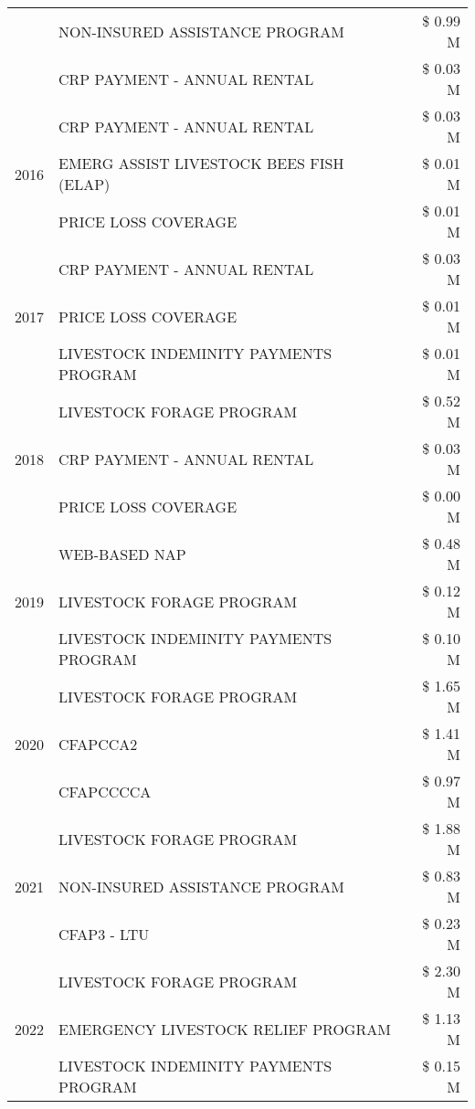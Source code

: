 \begin{tabular}{llr}
 & NON-INSURED ASSISTANCE PROGRAM & \$ 0.99 M \\
 & CRP PAYMENT - ANNUAL RENTAL & \$ 0.03 M \\
\cline{1-3}
\multirow[t]{3}{*}{2016} & CRP PAYMENT - ANNUAL RENTAL & \$ 0.03 M \\
 & EMERG ASSIST LIVESTOCK BEES FISH (ELAP) & \$ 0.01 M \\
 & PRICE LOSS COVERAGE & \$ 0.01 M \\
\cline{1-3}
\multirow[t]{3}{*}{2017} & CRP PAYMENT - ANNUAL RENTAL & \$ 0.03 M \\
 & PRICE LOSS COVERAGE & \$ 0.01 M \\
 & LIVESTOCK INDEMINITY PAYMENTS PROGRAM & \$ 0.01 M \\
\cline{1-3}
\multirow[t]{3}{*}{2018} & LIVESTOCK FORAGE PROGRAM & \$ 0.52 M \\
 & CRP PAYMENT - ANNUAL RENTAL & \$ 0.03 M \\
 & PRICE LOSS COVERAGE & \$ 0.00 M \\
\cline{1-3}
\multirow[t]{3}{*}{2019} & WEB-BASED NAP & \$ 0.48 M \\
 & LIVESTOCK FORAGE PROGRAM & \$ 0.12 M \\
 & LIVESTOCK INDEMINITY PAYMENTS PROGRAM & \$ 0.10 M \\
\cline{1-3}
\multirow[t]{3}{*}{2020} & LIVESTOCK FORAGE PROGRAM & \$ 1.65 M \\
 & CFAPCCA2 & \$ 1.41 M \\
 & CFAPCCCCA & \$ 0.97 M \\
\cline{1-3}
\multirow[t]{3}{*}{2021} & LIVESTOCK FORAGE PROGRAM & \$ 1.88 M \\
 & NON-INSURED ASSISTANCE PROGRAM & \$ 0.83 M \\
 & CFAP3 - LTU & \$ 0.23 M \\
\cline{1-3}
\multirow[t]{3}{*}{2022} & LIVESTOCK FORAGE PROGRAM & \$ 2.30 M \\
 & EMERGENCY LIVESTOCK RELIEF PROGRAM & \$ 1.13 M \\
 & LIVESTOCK INDEMINITY PAYMENTS PROGRAM & \$ 0.15 M \\
\cline{1-3}
\bottomrule
\end{tabular}
